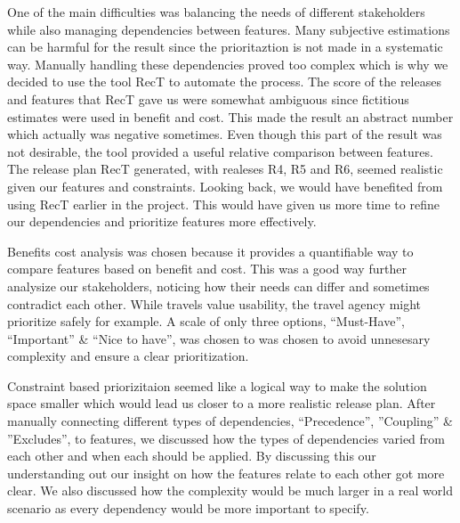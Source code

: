 One of the main difficulties was balancing the needs of different stakeholders while also managing dependencies between features. Many subjective estimations can be harmful for the result since the prioritaztion is not made in a systematic way. Manually handling these dependencies proved too complex which is why  we decided to use the tool RecT to automate the process. The score of the releases and features that RecT gave us were somewhat ambiguous since fictitious estimates were used in benefit and cost. This made the result an abstract number which actually was negative sometimes. Even though this part of the result was not desirable, the tool provided a useful relative comparison between features. The release plan RecT generated, with realeses R4, R5 and R6, seemed realistic given our features and constraints. Looking back, we would have benefited from using RecT earlier in the project. This would have given us more time to refine our dependencies and prioritize features more effectively.

Benefits cost analysis was chosen because it provides a quantifiable way to compare features based on benefit and cost. This was a good way further analysize our stakeholders, noticing how their needs can differ and sometimes contradict each other. While travels value usability, the travel agency might prioritize safely for example. A scale of only three options, “Must-Have”, “Important” \& “Nice to have”, was chosen to was chosen to avoid unnesesary complexity and ensure a clear prioritization.

Constraint based priorizitaion seemed like a logical way to make the solution space smaller which would lead us closer to a more realistic release plan. After manually connecting different types of dependencies, “Precedence”, ”Coupling” \& ”Excludes”, to features, we discussed how the types of dependencies varied from each other and when each should be applied. By discussing this our understanding out our insight on how the features relate to each other got more clear. We also discussed how the complexity would be much larger in a real world scenario as every dependency would be more important to specify. 
